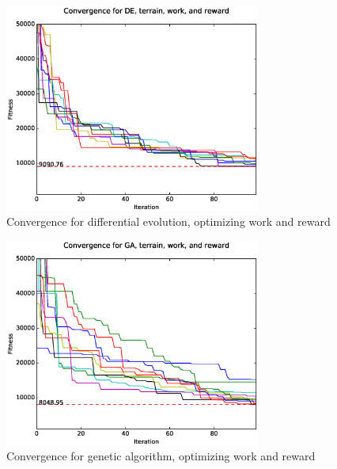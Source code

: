 \documentclass{tamuccthesis}
\begin{document}
\begin{figure}
    \captionsetup{justification=centering}
    \centering
        \includegraphics[width=0.75\textwidth,trim={0cm 0.75cm 0cm 0.75cm},clip]{conv_DE_b.eps}
    \caption{Convergence for differential evolution, optimizing work and reward}
    \label{fig:convergence_b_DE}
\end{figure}

\begin{figure}
    \captionsetup{justification=centering}
    \centering
        \includegraphics[width=0.75\textwidth,trim={0cm 0.75cm 0cm 0.75cm},clip]{conv_GA_b.eps}
    \caption{Convergence for genetic algorithm, optimizing work and reward}   
    \label{fig:convergence_b_SGA}
\end{figure}
\end{document}
